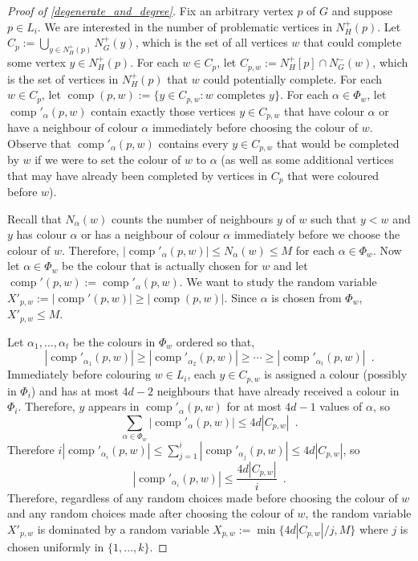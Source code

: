 \documentclass{patmorin}
\DeclareMathOperator{\comp}{comp}
\begin{document}
\begin{proof}[Proof of \cref{degenerate_and_degree}]
  Fix an arbitrary vertex $p$ of $G$ and suppose $p\in L_i$. We are interested in the number of problematic vertices in $N_H^+(p)$.  Let $C_p:=\bigcup_{y\in N^+_H(p)} N^+_G(y)$, which is the set of all vertices $w$ that could complete some vertex $y\in N^+_H(p)$. For each $w\in C_p$, let
  $C_{p,w}:=N_H^+[p]\cap N_G^-(w)$, which is the set of vertices in $N^+_{H}(p)$ that $w$ could potentially complete. For each $w\in C_p$, let $\comp(p,w):=\{y\in C_{p,w}:\text{$w$ completes $y$}\}$.  For each $\alpha\in\Phi_w$, let $\comp'_\alpha(p,w)$ contain exactly those vertices $y\in C_{p,w}$ that have colour $\alpha$ or have a neighbour of colour $\alpha$ immediately before choosing the colour of $w$.  Observe that $\comp'_\alpha(p,w)$ contains every $y\in C_{p,w}$ that would be completed by $w$ if we were to set the colour of $w$ to $\alpha$ (as well as some additional vertices that may have already been completed by vertices in $C_p$ that were coloured before $w$).

  Recall that $N_\alpha(w)$ counts the number of neighbours $y$ of $w$ such that $y < w$ and $y$ has colour $\alpha$ or has a neighbour of colour $\alpha$ immediately before we choose the colour of $w$.  Therefore,  $|\comp'_\alpha(p,w)|\le N_\alpha(w)\le M$ for each $\alpha\in\Phi_w$.  Now let $\alpha\in\Phi_w$ be the colour that is actually chosen for $w$ and let $\comp'(p,w):=\comp'_\alpha(p,w)$.  We want to study the random variable $X'_{p,w}:=|\comp'(p,w)|\ge |\comp(p,w)|$.  Since $\alpha$ is chosen from $\Phi_w$, $X'_{p,w} \le M$.

  Let $\alpha_1,\ldots,\alpha_t$ be the colours in $\Phi_w$ ordered so that,
  \[
    |\comp'_{\alpha_1}(p,w)|\ge|\comp'_{\alpha_2}(p,w)|\ge\cdots\ge |\comp'_{\alpha_t}(p,w)| \enspace .
  \]
  Immediately before colouring $w\in L_i$, each $y\in C_{p,w}$ is assigned a colour (possibly in $\Phi_i$) and has at most $4d-2$ neighbours that have already received a colour in $\Phi_i$.  Therefore, $y$ appears in
  $\comp'_{\alpha}(p,w)$ for at most $4d-1$ values of $\alpha$, so
  \[
    \sum_{\alpha\in\Phi_w} |\comp'_{\alpha}(p,w)| \le 4d| C_{p,w}| \enspace .
  \]
  Therefore $i|\comp'_{\alpha_i}(p,w)|\le\sum_{j=1}^i|\comp'_{\alpha_j}(p,w)|\le 4d|C_{p,w}|$, so
  \[
    |\comp'_{\alpha_i}(p,w)|\le \frac{4d|C_{p,w}|}{i} \enspace .
  \]
  Therefore, regardless of any random choices made before choosing the colour of $w$ and any random choices made after choosing the colour of $w$, the random variable $X'_{p,w}$ is dominated by a random variable $X_{p,w}:=\min\{4d|C_{p,w}|/j,M\}$ where $j$ is chosen uniformly in $\{1,\ldots,k\}$.


\end{proof}
\end{document}
